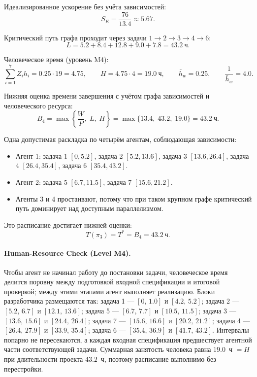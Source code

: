 \documentclass[12pt,a4paper]{article}
\theoremstyle{definition}
\begin{document}
Идеализированное ускорение без учёта зависимостей:
\[
  S_E = \frac{76}{13.4} \approx 5.67.
\]

Критический путь графа проходит через задачи $1 \to 2 \to 3 \to 4 \to 6$:
\[
  L = 5.2 + 8.4 + 12.8 + 9.0 + 7.8 = 43.2~\text{ч}.
\]

Человеческое время (уровень M4):
\[
  \sum_{i=1}^{7} Z_i h_i = 0.25 \cdot 19 = 4.75,
  \qquad
  H = 4.75 \cdot 4 = 19.0~\text{ч},
  \qquad
  \bar{h}_w = 0.25,
  \qquad
  \frac{1}{\bar{h}_w} = 4.0.
\]

Нижняя оценка времени завершения с учётом графа зависимостей и человеческого ресурса:
\[
  B_4 = \max\left\{\frac{W}{P},\; L,\; H\right\} = \max\{13.4,\; 43.2,\; 19.0\} = 43.2~\text{ч}.
\]

Одна допустимая раскладка по четырём агентам, соблюдающая зависимости:
\begin{itemize}
  \item Агент 1: задача 1 $[0,5.2]$, задача 2 $[5.2,13.6]$, задача 3 $[13.6,26.4]$, задача 4 $[26.4,35.4]$, задача 6 $[35.4,43.2]$.
  \item Агент 2: задача 5 $[6.7,11.5]$, задача 7 $[15.6,21.2]$.
  \item Агенты 3 и 4 простаивают, потому что при таком крупном графе критический путь доминирует над доступным параллелизмом.
\end{itemize}

Это расписание достигает нижней оценки:
\[
  T(\pi_3)=T^{*}=B_4=43.2~\text{ч}.
\]

\paragraph{Human-Resource Check (Level M4).}
Чтобы агент не начинал работу до постановки задачи, человеческое время делится поровну между подготовкой входной спецификации и итоговой проверкой; между этими этапами агент выполняет реализацию. Блоки разработчика размещаются так: задача 1 --- $[0,\,1.0]$ и $[4.2,\,5.2]$; задача 2 --- $[5.2,\,6.7]$ и $[12.1,\,13.6]$; задача 5 --- $[6.7,\,7.7]$ и $[10.5,\,11.5]$; задача 3 --- $[13.6,\,15.6]$ и $[24.4,\,26.4]$; задача 7 --- $[15.6,\,16.6]$ и $[20.2,\,21.2]$; задача 4 --- $[26.4,\,27.9]$ и $[33.9,\,35.4]$; задача 6 --- $[35.4,\,36.9]$ и $[41.7,\,43.2]$. Интервалы попарно не пересекаются, а каждая входная спецификация предшествует агентной части соответствующей задачи. Суммарная занятость человека равна $19.0$~ч $= H$ при длительности проекта $43.2$~ч, поэтому расписание выполнимо без перестройки.
\end{document}
